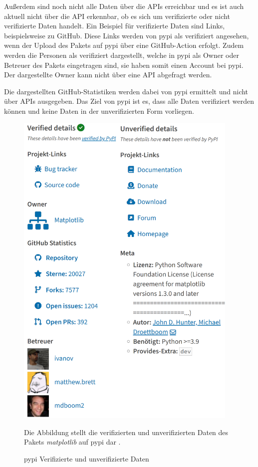 Außerdem sind noch nicht alle Daten über die APIs erreichbar und es ist auch aktuell nicht über die API erkennbar, ob es sich um verifizierte oder nicht verifizierte Daten handelt.
Ein Beispiel für verifizierte Daten sind Links, beispielsweise zu GitHub.
Diese Links werden von \gls{pypi} als verifiziert angesehen, wenn der Upload des Pakets auf \gls{pypi} über eine GitHub-Action erfolgt.
Zudem werden die Personen als verifiziert dargestellt, welche in \gls{pypi} als Owner oder Betreuer des Pakets eingetragen sind, sie haben somit einen Account bei \gls{pypi}.
Der dargestellte Owner kann nicht über eine API abgefragt werden.

Die dargestellten GitHub-Statistiken werden dabei von \gls{pypi} ermittelt und nicht über APIs ausgegeben.
Das Ziel von \gls{pypi} ist es, dass alle Daten verifiziert werden können und keine Daten in der unverifizierten Form vorliegen.

\begin{figure}
    \begin{center}
        \includegraphics[width=0.95\textwidth]{bilder/pypi.png}
    \end{center}
    \caption{\gls{pypi} Verifizierte und unverifizierte Daten}
    \label{fig:pypi_verified_unverified_details}
    \small
    Die Abbildung stellt die verifizierten und unverifizierten Daten des Pakets \emph{matplotlib} auf \gls{pypi} dar \autocite{python_software_foundation_pypi_2024}.
\end{figure}

